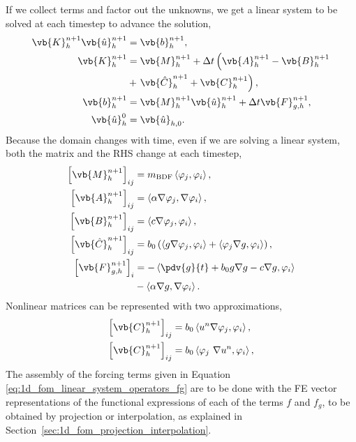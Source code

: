 \documentclass[../main.tex]{subfiles}
\newcommand{\inner}[2]{\left<#1, #2\right>}
\newcommand{\Ah}[1]{\ensuremath{\vb{#1}^{n+1}_h}}
\begin{document}
If we collect terms and factor out the unknowns, we get a linear system to be solved at each timestep to advance the solution,
\begin{subequations}
    \begin{align}
        \label{eq:1d_fom_linear_system_timestep}
        \vb{K}_h^{n+1} \vb{\hat{u}}_h^{n+1} &= \vb{b}_h^{n+1}, \\
        \vb{K}_h^{n+1} &= \Ah{M} + \Delta t \left(\Ah{A} - \Ah{B}\right. \nonumber\\
                       &+ \left.\Ah{\hat{C}} + \Ah{C}\right), \\
        \vb{b}_h^{n+1} &= \Ah{M} \Ah{\hat{u}} + \Delta t \vb{F}_{g,h}^{n+1}, \\
        \vb{\hat{u}}_h^{0} &= \vb{\hat{u}}_{h,0}.
    \end{align}
\end{subequations}
Because the domain changes with time, even if we are solving a linear system, both the matrix and the RHS change at each timestep,
\begin{subequations}
    \label{eq:1d_fom_linear_system_operators}
    \begin{align}
        \left[\vb{M}_{h}^{n+1}\right]_{ij}       &= m_{\text{BDF}} \inner{\varphi_j}{\varphi_i}, \\
        \left[\vb{A}_{h}^{n+1}\right]_{ij}       &= \inner{\alpha \grad \varphi_j}{\grad \varphi_i}, \\
        \left[\vb{B}_{h}^{n+1}\right]_{ij}       &= \inner{c \grad \varphi_j}{\varphi_i}, \\
        \left[\vb{\hat{C}}_{h}^{n+1}\right]_{ij} &= b_0 \left(\inner{g \grad \varphi_j}{\varphi_i} + \inner{\varphi_j \grad g}{\varphi_i}\right), \\
        \left[\vb{F}_{{g,h}}^{n+1}\right]_{i}    &= -\inner{\pdv{g}{t}+b_0 g \grad g - c \grad g}{\varphi_i} \nonumber\\
                                                 &  -\inner{\alpha \grad g}{\grad \varphi_i}. \label{eq:1d_fom_linear_system_operators_fg}
    \end{align}
\end{subequations}
Nonlinear matrices can be represented with two approximations,
\begin{subequations}
    \label{eq:1d_fom_nonlinear_system_operators}
    \begin{align}
        \left[\vb{C}_{h}^{n+1}\right]_{ij} &= b_0 \inner{u^{n} \grad \varphi_j}{\varphi_i}, \\
        \left[\vb{C}_{h}^{n+1}\right]_{ij} &= b_0 \inner{\varphi_j \grad u^{n}}{\varphi_i}, 
    \end{align}
\end{subequations}
The assembly of the forcing terms given in Equation \eqref{eq:1d_fom_linear_system_operators_fg}
are to be done with the FE vector representations of the functional expressions of each of the terms $f$ and $f_g$, to be obtained by projection or interpolation, as explained in Section~\ref{sec:1d_fom_projection_interpolation}.
\end{document}
